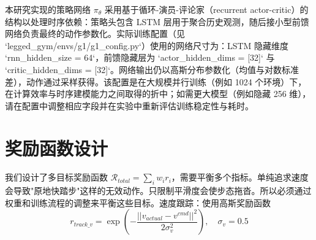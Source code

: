 本研究实现的策略网络 $\pi_\theta$ 采用基于循环-演员-评论家（recurrent actor-critic）的结构以处理时序依赖：策略头包含 LSTM 层用于聚合历史观测，随后接小型前馈网络负责最终的动作参数化。实际训练配置（见 `legged_gym/envs/g1/g1_config.py`）使用的网络尺寸为：LSTM 隐藏维度 `rnn_hidden_size = 64`，前馈隐藏层为 `actor_hidden_dims = [32]` 与 `critic_hidden_dims = [32]`。网络输出仍以高斯分布参数化（均值与对数标准差），动作通过采样获得。该配置是在大规模并行训练（例如 1024 个环境）下，在计算效率与时序建模能力之间取得的折中；如需更大模型（例如隐藏 256 维），请在配置中调整相应字段并在实验中重新评估训练稳定性与耗时。

\section{奖励函数设计}
我们设计了多目标奖励函数 $\mathcal{R}_{total}=\sum_{i}w_{i}r_{i}$，需要平衡多个指标。单纯追求速度会导致"原地快踏步"这样的无效动作。只限制平滑度会使步态拖沓。所以必须通过权重和训练流程的调整来平衡这些目标。速度跟踪：使用高斯奖励函数
\begin{equation}
r_{track\_v}=\exp\left(-\frac{||v_{actual}-v^{cmd}||^{2}}{2\sigma_{v}^2}\right), \quad \sigma_v = 0.5
\label{eq:velocity_reward}
\end{equation}

